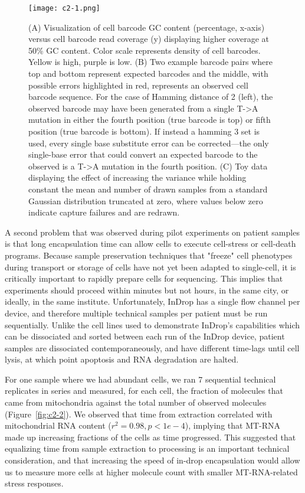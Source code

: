 \begin{figure} 
\centering
\texttt{[image: c2-1.png]} 
\caption{(A) Visualization of cell barcode GC content (percentage, x-axis) versus cell barcode read coverage (y) displaying higher coverage at 50\% GC content. 
  Color scale represents density of cell barcodes. Yellow is high, purple is low.  
(B) Two example barcode pairs where top and bottom represent expected barcodes and the middle, with possible errors highlighted in red, represents an observed cell barcode sequence. For the case of Hamming distance of 2 (left), the observed barcode may have been generated from a single T->A mutation in either the fourth position (true barcode is top) or fifth position (true barcode is bottom). If instead a hamming 3 set is used, every single base substitute error can be corrected---the only single-base error that could convert an expected barcode to the observed is a T->A mutation in the fourth position. (C) Toy data displaying the effect of increasing the variance while holding constant the mean and number of drawn samples from a standard Gaussian distribution truncated at zero, where values below zero indicate capture failures and are redrawn.}
\label{fig:c2-1}
\end{figure}

A second problem that was observed during pilot experiments on patient samples is that long encapsulation time can allow cells to execute cell-stress or cell-death programs.
Because sample preservation techniques that "freeze" cell phenotypes during transport or storage of cells have not yet been adapted to single-cell, it is critically important to rapidly prepare cells for sequencing. 
This implies that experiments should proceed within minutes but not hours, in the same city, or ideally, in the same institute. 
Unfortunately, InDrop has a single flow channel per device, and therefore multiple technical samples per patient must be run sequentially. 
Unlike the cell lines used to demonstrate InDrop's capabilities which can be dissociated and sorted between each run of the InDrop device, patient samples are dissociated contemporaneously, and have different time-lags until cell lysis, at which point apoptosis and RNA degradation are halted.

For one sample where we had abundant cells, we ran 7 sequential technical replicates in series and measured, for each cell, the fraction of molecules that came from mitochondria against the total number of observed molecules (Figure~\ref{fig:c2-2}).
We observed that time from extraction correlated with mitochondrial RNA content ($r^2 = 0.98, p < 1e-4$), implying that MT-RNA made up increasing fractions of the cells as time progressed. 
This suggested that equalizing time from sample extraction to processing is an important technical consideration, and that increasing the speed of in-drop encapsulation would allow us to measure more cells at higher molecule count with smaller MT-RNA-related stress responses. 

